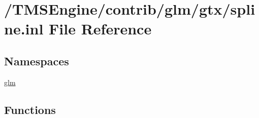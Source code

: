\hypertarget{spline_8inl}{}\section{/\+T\+M\+S\+Engine/contrib/glm/gtx/spline.inl File Reference}
\label{spline_8inl}
\subsection*{Namespaces}
\begin{DoxyCompactItemize}
\item 
 \hyperlink{namespaceglm}{glm}
\end{DoxyCompactItemize}
\subsection*{Functions}
